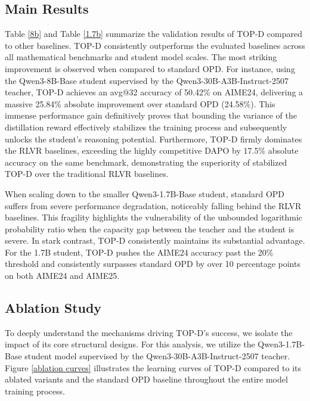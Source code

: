 \documentclass{article}
\theoremstyle{plain}
\theoremstyle{definition}
\theoremstyle{remark}
\begin{document}
\subsection{Main Results}\label{Main Results}
Table \ref{8b} and Table \ref{1.7b} summarize the validation results of TOP-D compared to other baselines. TOP-D consistently outperforms the evaluated baselines across all mathematical benchmarks and student model scales. The most striking improvement is observed when compared to standard OPD. For instance, using the Qwen3-8B-Base student supervised by the Qwen3-30B-A3B-Instruct-2507 teacher, TOP-D achieves an avg@32 accuracy of 50.42\% on AIME24, delivering a massive 25.84\% absolute improvement over standard OPD (24.58\%). This immense performance gain definitively proves that bounding the variance of the distillation reward effectively stabilizes the training process and subsequently unlocks the student's reasoning potential. Furthermore, TOP-D firmly dominates the RLVR baselines, exceeding the highly competitive DAPO by 17.5\% absolute accuracy on the same benchmark, demonstrating the superiority of stabilized TOP-D over the traditional RLVR baselines.

When scaling down to the smaller Qwen3-1.7B-Base student, standard OPD suffers from severe performance degradation, noticeably falling behind the RLVR baselines. This fragility highlights the vulnerability of the unbounded logarithmic probability ratio when the capacity gap between the teacher and the student is severe. In stark contrast, TOP-D consistently maintains its substantial advantage. For the 1.7B student, TOP-D pushes the AIME24 accuracy past the 20\% threshold and consistently surpasses standard OPD by over 10 percentage points on both AIME24 and AIME25.


\subsection{Ablation Study}\label{Ablation Study}
To deeply understand the mechanisms driving TOP-D's success, we isolate the impact of its core structural designs. For this analysis, we utilize the Qwen3-1.7B-Base student model supervised by the Qwen3-30B-A3B-Instruct-2507 teacher. Figure \ref{ablation curves} illustrates the learning curves of TOP-D compared to its ablated variants and the standard OPD baseline throughout the entire model training process.
\end{document}
